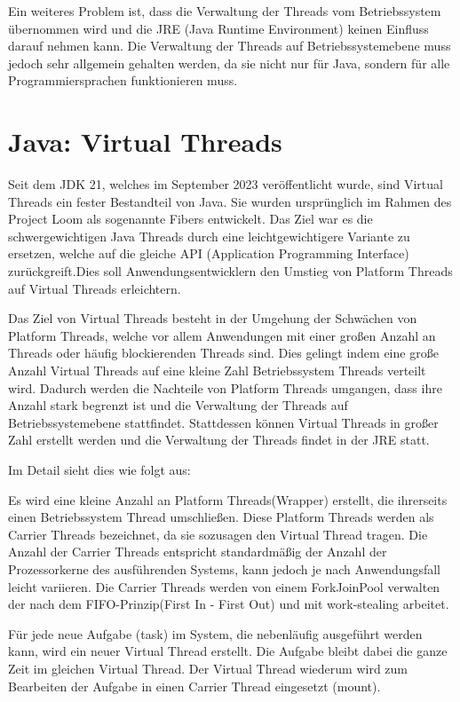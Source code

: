 \documentclass[fontsize=12pt,paper=a4,twoside=semi,parskip=half-,headsepline,headinclude]{scrreprt}
\begin{document}
Ein weiteres Problem ist, dass die Verwaltung der Threads vom Betriebssystem über\-nommen wird und die JRE (Java Runtime Environment) keinen Einfluss darauf nehmen kann. Die Verwaltung der Threads auf Betriebssystemebene muss jedoch sehr allgemein gehalten werden, da sie nicht nur für Java, sondern für alle Programmiersprachen funktionieren muss.

\section{Java: Virtual Threads}

Seit dem JDK 21, welches im September 2023 veröffentlicht wurde, sind Virtual Threads ein fester Bestandteil von Java. Sie wurden ursprünglich im Rahmen des Project Loom als sogenannte Fibers entwickelt. Das Ziel war es die schwergewichtigen Java Threads durch eine leichtgewichtigere Variante zu ersetzen, welche auf die gleiche API (Application Programming Interface) zurückgreift.Dies soll Anwendungsentwicklern den Umstieg von  Platform Threads auf Virtual Threads erleichtern.

Das Ziel von Virtual Threads besteht in der Umgehung der Schwächen von Platform Threads, welche vor allem Anwendungen mit einer großen Anzahl an Threads oder häufig blockierenden Threads sind. Dies gelingt indem eine große Anzahl Virtual Threads auf eine kleine Zahl Betriebssystem Threads verteilt wird. Dadurch werden die Nachteile von Platform Threads umgangen, dass ihre Anzahl stark begrenzt ist und die Verwaltung der Threads auf Betriebssystemebene stattfindet. Stattdessen können Virtual Threads in großer Zahl erstellt werden und die Verwaltung der Threads findet in der JRE statt.

Im Detail sieht dies wie folgt aus:

Es wird eine kleine Anzahl an Platform Threads(Wrapper) erstellt, die ihrerseits einen Betriebssystem Thread umschließen. Diese Platform Threads werden als Carrier Threads bezeichnet, da sie sozusagen den Virtual Thread tragen. Die Anzahl der Carrier Threads entspricht standardmäßig der Anzahl der Prozessorkerne des ausführenden Systems, kann jedoch je nach Anwendungsfall leicht variieren. Die Carrier Threads werden von einem ForkJoinPool verwalten der nach dem FIFO-Prinzip(First In - First Out) und mit work-stealing arbeitet.\cite{Pressler2023a}

Für jede neue Aufgabe (task) im System, die nebenläufig ausgeführt werden kann, wird ein neuer Virtual Thread erstellt. Die Aufgabe bleibt dabei die ganze Zeit im gleichen Virtual Thread. Der Virtual Thread wiederum wird zum Bearbeiten der Aufgabe in einen Carrier Thread eingesetzt (mount). 
\end{document}
